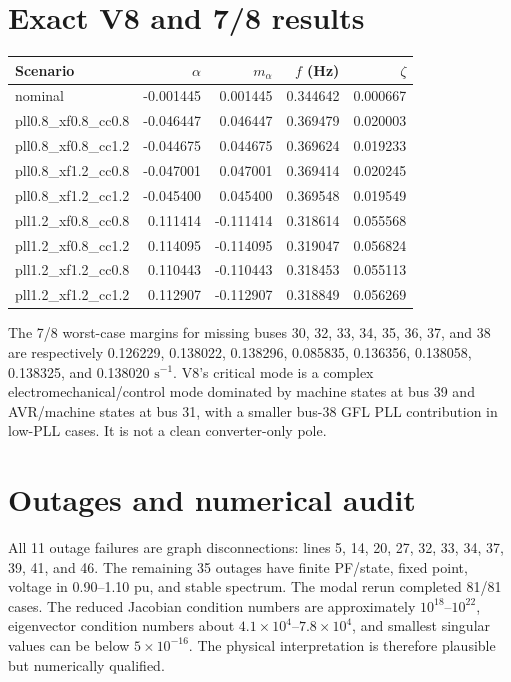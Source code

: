 \documentclass[10pt,a4paper]{article}
\begin{document}
\section{Exact V8 and 7/8 results}
\begin{longtable}{lrrrr}
\toprule
Scenario & $\alpha$ & $m_\alpha$ & $f$ (Hz) & $\zeta$\\
\midrule
nominal & -0.001445 & 0.001445 & 0.344642 & 0.000667\\
pll0.8\_xf0.8\_cc0.8 & -0.046447 & 0.046447 & 0.369479 & 0.020003\\
pll0.8\_xf0.8\_cc1.2 & -0.044675 & 0.044675 & 0.369624 & 0.019233\\
pll0.8\_xf1.2\_cc0.8 & -0.047001 & 0.047001 & 0.369414 & 0.020245\\
pll0.8\_xf1.2\_cc1.2 & -0.045400 & 0.045400 & 0.369548 & 0.019549\\
pll1.2\_xf0.8\_cc0.8 & 0.111414 & -0.111414 & 0.318614 & 0.055568\\
pll1.2\_xf0.8\_cc1.2 & 0.114095 & -0.114095 & 0.319047 & 0.056824\\
pll1.2\_xf1.2\_cc0.8 & 0.110443 & -0.110443 & 0.318453 & 0.055113\\
pll1.2\_xf1.2\_cc1.2 & 0.112907 & -0.112907 & 0.318849 & 0.056269\\
\bottomrule
\end{longtable}

The 7/8 worst-case margins for missing buses 30, 32, 33, 34, 35, 36, 37, and 38 are respectively 0.126229, 0.138022, 0.138296, 0.085835, 0.136356, 0.138058, 0.138325, and 0.138020 $\mathrm{s}^{-1}$. V8's critical mode is a complex electromechanical/control mode dominated by machine states at bus 39 and AVR/machine states at bus 31, with a smaller bus-38 GFL PLL contribution in low-PLL cases. It is not a clean converter-only pole.

\section{Outages and numerical audit}
All 11 outage failures are graph disconnections: lines 5, 14, 20, 27, 32, 33, 34, 37, 39, 41, and 46. The remaining 35 outages have finite PF/state, fixed point, voltage in 0.90--1.10 pu, and stable spectrum. The modal rerun completed 81/81 cases. The reduced Jacobian condition numbers are approximately $10^{18}$--$10^{22}$, eigenvector condition numbers about $4.1\times10^4$--$7.8\times10^4$, and smallest singular values can be below $5\times10^{-16}$. The physical interpretation is therefore plausible but numerically qualified.
\end{document}
